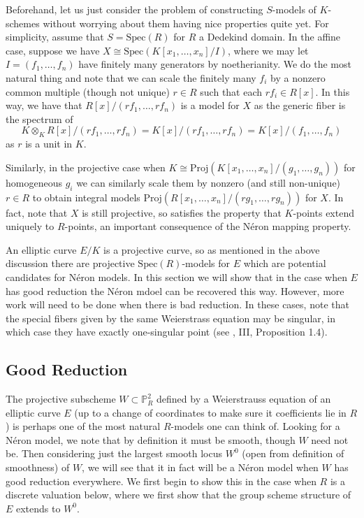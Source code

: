 \documentclass{article}
\theoremstyle{definition}
\theoremstyle{remark}
\theoremstyle{plain}
\newcommand{\mb}[1]{\mathbb{#1}}
\begin{document}
Beforehand, let us just consider the problem of constructing $S$-models of $K$-schemes without worrying about them having nice properties quite yet.
For simplicity, assume that $S = \text{Spec}(R)$ for $R$ a Dedekind domain.
In the affine case, suppose we have $X \cong \text{Spec}(K[x_1, \dots, x_n]/I)$, where we may let $I = (f_1, \dots, f_n)$ have finitely many generators by noetherianity. 
We do the most natural thing and note that we can scale the finitely many $f_i$ by a nonzero common multiple (though not unique) $r \in R$ such that each $rf_i \in R[x]$.
In this way, we have that $R[x]/(rf_1, \dots, rf_n)$ is a model for $X$ as the generic fiber is the spectrum of 
\[K \otimes_K R[x]/(rf_1, \dots, rf_n) = K[x]/(rf_1, \dots, rf_n) = K[x]/(f_1, \dots, f_n)\]
as $r$ is a unit in $K$. \newline

\indent Similarly, in the projective case when $K \cong \text{Proj}(K[x_1, \dots, x_n]/(g_1, \dots, g_n))$ for homogeneous $g_i$ we can similarly scale them by nonzero (and still non-unique) $r \in R$ to obtain integral models $\text{Proj}(R[x_1, \dots, x_n]/(rg_1, \dots, rg_n))$  for $X$.
In fact, note that $X$ is still projective, so satisfies the property that $K$-points extend uniquely to $R$-points, an important consequence of the N\'eron mapping property.

An elliptic curve $E/K$ is a projective curve, so as mentioned in the above discussion there are projective $\text{Spec}(R)$-models for $E$ which are potential candidates for N\'eron models.
In this section we will show that in the case when $E$ has good reduction the N\'eron mdoel can be recovered this way. 
However, more work will need to be done when there is bad reduction.
In these cases, note that the special fibers given by the same Weierstrass equation may be singular, in which case they have exactly one-singular point (see \cite{AEC1}, III, Proposition 1.4).

\subsection{Good Reduction}

The projective subscheme $W \subset \mb{P}^2_R$ defined by a Weierstrauss equation of an elliptic curve $E$ (up to a change of coordinates to make sure it coefficients lie in $R$) is perhaps one of the most natural $R$-models one can think of.
Looking for a N\'eron model, we note that by definition it must be smooth, though $W$ need not be.
Then considering just the largest smooth locus $W^0$ (open from definition of smoothness) of $W$, we will see that it in fact will be a N\'eron model when $W$ has good reduction everywhere. 
We first begin to show this in the case when $R$ is a discrete valuation below, where we first show that the group scheme structure of $E$ extends to $W^0$.
\end{document}
